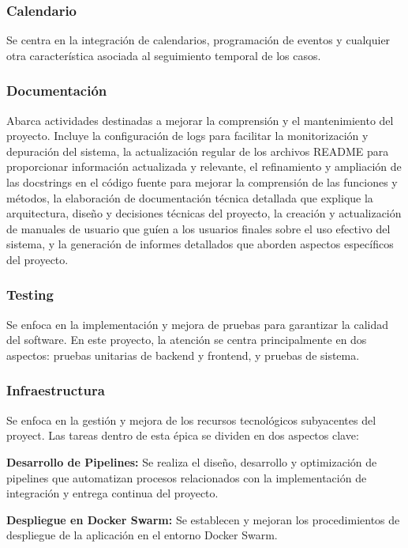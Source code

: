 \subsubsection{Calendario}
Se centra en la integración de calendarios, programación de eventos y cualquier otra característica asociada al seguimiento temporal de los casos.

\subsubsection{Documentación}
Abarca actividades destinadas a mejorar la comprensión y el mantenimiento del proyecto. Incluye la configuración de logs para facilitar la monitorización y depuración del sistema, la actualización regular de los archivos README para proporcionar información actualizada y relevante, el refinamiento y ampliación de las docstrings en el código fuente para mejorar la comprensión de las funciones y métodos, la elaboración de documentación técnica detallada que explique la arquitectura, diseño y decisiones técnicas del proyecto, la creación y actualización de manuales de usuario que guíen a los usuarios finales sobre el uso efectivo del sistema, y la generación de informes detallados que aborden aspectos específicos del proyecto.

\subsubsection{Testing}
Se enfoca en la implementación y mejora de pruebas para garantizar la calidad del software. En este proyecto, la atención se centra principalmente en dos aspectos: pruebas unitarias de backend y frontend, y pruebas de sistema.

\subsubsection{Infraestructura}
Se enfoca en la gestión y mejora de los recursos tecnológicos subyacentes del proyect. Las tareas dentro de esta épica se dividen en dos aspectos clave:

\textbf{Desarrollo de Pipelines:} Se realiza el diseño, desarrollo y optimización de pipelines que automatizan procesos relacionados con la implementación de integración y entrega continua del proyecto.

\textbf{Despliegue en Docker Swarm:} Se establecen y mejoran los procedimientos de despliegue de la aplicación en el entorno Docker Swarm. 



